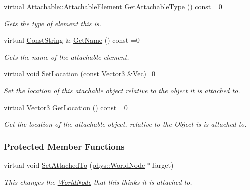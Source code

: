 \begin{DoxyCompactItemize}
virtual \hyperlink{classphys_1_1Attachable_acd1fca033e7cc0bb3024a92d466d213a}{Attachable::AttachableElement} \hyperlink{classphys_1_1Attachable_a1c84342fe19d8eef33de4789e19c9d00}{GetAttachableType} () const =0
\begin{DoxyCompactList}\small\item\em Gets the type of element this is. \item\end{DoxyCompactList}\item 
\hypertarget{classphys_1_1Attachable_a0a07d727fa2630dc3550fd991ca28256}{
virtual \hyperlink{namespacephys_a5ce5049f8b4bf88d6413c47b504ebb31}{ConstString} \& \hyperlink{classphys_1_1Attachable_a0a07d727fa2630dc3550fd991ca28256}{GetName} () const =0}
\label{classphys_1_1Attachable_a0a07d727fa2630dc3550fd991ca28256}

\begin{DoxyCompactList}\small\item\em Gets the name of the attachable element. \item\end{DoxyCompactList}\item 
virtual void \hyperlink{classphys_1_1Attachable_a3555ca694cfc9ff96665c16b3e95c698}{SetLocation} (const \hyperlink{classphys_1_1Vector3}{Vector3} \&Vec)=0
\begin{DoxyCompactList}\small\item\em Set the location of this atachable object relative to the object it is attached to. \item\end{DoxyCompactList}\item 
virtual \hyperlink{classphys_1_1Vector3}{Vector3} \hyperlink{classphys_1_1Attachable_acb410686b2719524eb484b50cc9054a4}{GetLocation} () const =0
\begin{DoxyCompactList}\small\item\em Get the location of the attachable object, relative to the Object is is attached to. \item\end{DoxyCompactList}\end{DoxyCompactItemize}
\subsubsection*{Protected Member Functions}
\begin{DoxyCompactItemize}
\item 
virtual void \hyperlink{classphys_1_1Attachable_a6f06a8c9950d5a9bfec0c73792cdd65f}{SetAttachedTo} (\hyperlink{classphys_1_1WorldNode}{phys::WorldNode} $\ast$Target)
\begin{DoxyCompactList}\small\item\em This changes the \hyperlink{classphys_1_1WorldNode}{WorldNode} that this thinks it is attached to. \item\end{DoxyCompactList}\end{DoxyCompactItemize}
